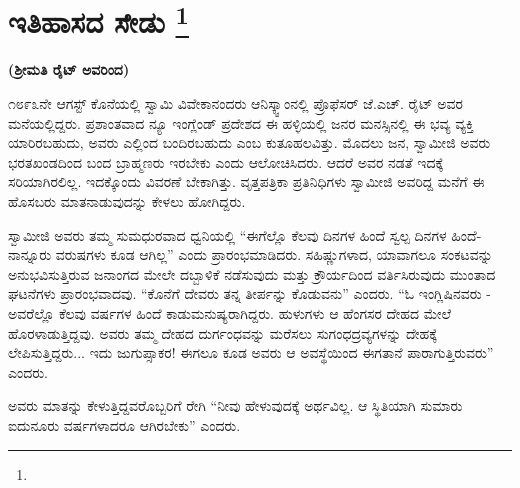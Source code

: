 
\chapter[ಇತಿಹಾಸದ ಸೇಡು ]{ಇತಿಹಾಸದ ಸೇಡು \protect\footnote{}}

\centerline{\textbf{(ಶ‍್ರೀಮತಿ ರೈಟ್​ ಅವರಿಂದ)}}

\vskip 5pt

೧೮೯೩ನೇ ಆಗಸ್ಟ್​ ಕೊನೆಯಲ್ಲಿ ಸ್ವಾಮಿ ವಿವೇಕಾನಂದರು ಆನಿಸ್ಕ್ವಾಂನಲ್ಲಿ ಪ್ರೊಫೆಸರ್​ ಜೆ.ಎಚ್​. ರೈಟ್​ ಅವರ ಮನೆಯಲ್ಲಿದ್ದರು. ಪ್ರಶಾಂತವಾದ ನ್ಯೂ ಇಂಗ್ಲೆಂಡ್​ ಪ್ರದೇಶದ ಈ ಹಳ್ಳಿಯಲ್ಲಿ ಜನರ ಮನಸ್ಸಿನಲ್ಲಿ ಈ ಭವ್ಯ ವ್ಯಕ್ತಿ ಯಾರಿರಬಹುದು, ಅವರು ಎಲ್ಲಿಂದ ಬಂದಿರಬಹುದು ಎಂಬ ಕುತೂಹಲವಿತ್ತು. ಮೊದಲು ಜನ, ಸ್ವಾಮೀಜಿ ಅವರು ಭರತಖಂಡದಿಂದ ಬಂದ ಬ್ರಾಹ್ಮಣರು ಇರಬೇಕು ಎಂದು ಆಲೋಚಿಸಿದರು. ಆದರೆ ಅವರ ನಡತೆ ಇದಕ್ಕೆ ಸರಿಯಾಗಿರಲಿಲ್ಲ. ಇದಕ್ಕೊಂದು ವಿವರಣೆ ಬೇಕಾಗಿತ್ತು. ವೃತ್ತಪತ್ರಿಕಾ ಪ್ರತಿನಿಧಿಗಳು ಸ್ವಾಮೀಜಿ ಅವರಿದ್ದ ಮನೆಗೆ ಈ ಹೊಸಬರು ಮಾತನಾಡುವುದನ್ನು ಕೇಳಲು ಹೋಗಿದ್ದರು.

\vskip 7pt

ಸ್ವಾಮೀಜಿ ಅವರು ತಮ್ಮ ಸುಮಧುರವಾದ ಧ್ವನಿಯಲ್ಲಿ “ಈಗೆಲ್ಲೊ ಕೆಲವು ದಿನಗಳ ಹಿಂದೆ ಸ್ವಲ್ಪ ದಿನಗಳ ಹಿಂದೆ-ನಾನ್ನೂರು ವರುಷಗಳು ಕೂಡ ಆಗಿಲ್ಲ” ಎಂದು ಪ್ರಾರಂಭಮಾಡಿದರು. ಸಹಿಷ್ಣುಗಳಾದ, ಯಾವಾಗಲೂ ಸಂಕಟವನ್ನು ಅನುಭವಿಸುತ್ತಿರುವ ಜನಾಂಗದ ಮೇಲೇ ದಬ್ಬಾಳಿಕೆ ನಡೆಸುವುದು ಮತ್ತು ಕ್ರೌರ್ಯದಿಂದ ವರ್ತಿಸಿರುವುದು ಮುಂತಾದ ಘಟನೆಗಳು ಪ್ರಾರಂಭವಾದವು. “ಕೊನೆಗೆ ದೇವರು ತನ್ನ ತೀರ್ಪನ್ನು ಕೊಡುವನು” ಎಂದರು. “ಓ ಇಂಗ್ಲಿಷಿನವರು - ಅವರೆಲ್ಲೊ ಕೆಲವು ವರ್ಷಗಳ ಹಿಂದೆ ಕಾಡುಮನುಷ್ಯರಾಗಿದ್ದರು. ಹುಳುಗಳು ಆ ಹೆಂಗಸರ ದೇಹದ ಮೇಲೆ ಹೊರಳಾಡುತ್ತಿದ್ದವು. ಅವರು ತಮ್ಮ ದೇಹದ ದುರ್ಗಂಧವನ್ನು ಮರೆಸಲು ಸುಗಂಧದ್ರವ್ಯಗಳನ್ನು ದೇಹಕ್ಕೆ ಲೇಪಿಸುತ್ತಿದ್ದರು... ಇದು ಜುಗುಪ್ಸಾಕರ! ಈಗಲೂ ಕೂಡ ಅವರು ಆ ಅವಸ್ಥೆಯಿಂದ ಈಗತಾನೆ ಪಾರಾಗುತ್ತಿರುವರು” ಎಂದರು.

\vskip 7pt

ಅವರು ಮಾತನ್ನು ಕೇಳುತ್ತಿದ್ದವರೊಬ್ಬರಿಗೆ ರೇಗಿ “ನೀವು ಹೇಳುವುದಕ್ಕೆ ಅರ್ಥವಿಲ್ಲ. ಆ ಸ್ಥಿತಿಯಾಗಿ ಸುಮಾರು ಐದುನೂರು ವರ್ಷಗಳಾದರೂ ಆಗಿರಬೇಕು” ಎಂದರು.

\vskip 7pt

